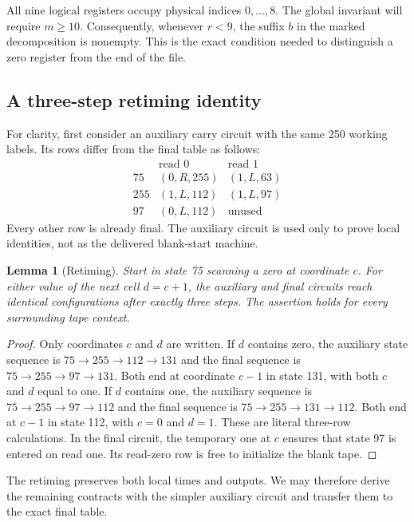 \documentclass[11pt]{article}
\newtheorem{lemma}{Lemma}
\begin{document}
All nine logical registers occupy physical indices $0,\ldots,8$.  The
global invariant will require $m\geq10$.  Consequently, whenever $r<9$,
the suffix $b$ in the marked decomposition is nonempty.  This is the exact
condition needed to distinguish a zero register from the end of the file.

\subsection{A three-step retiming identity}

For clarity, first consider an auxiliary carry circuit with the same 250
working labels.  Its rows differ from the final table as follows:
\[
\begin{array}{c|cc}
 & \text{read }0 & \text{read }1\\ \hline
75 & (0,R,255)&(1,L,63)\\
255&(1,L,112)&(1,L,97)\\
97&(0,L,112)&\text{unused}
\end{array}
\]
Every other row is already final.  The auxiliary circuit is used only to
prove local identities, not as the delivered blank-start machine.

\begin{lemma}[Retiming]
Start in state 75 scanning a zero at coordinate $c$.  For either value of
the next cell $d=c+1$, the auxiliary and final circuits reach identical
configurations after exactly three steps.  The assertion holds for every
surrounding tape context.
\end{lemma}
\begin{proof}
Only coordinates $c$ and $d$ are written.  If $d$ contains zero, the
auxiliary state sequence is
$75\to255\to112\to131$ and the final sequence is
$75\to255\to97\to131$.
Both end at coordinate $c-1$ in state 131, with both $c$ and $d$ equal to
one.  If $d$ contains one, the auxiliary sequence is
$75\to255\to97\to112$ and the final sequence is
$75\to255\to131\to112$.
Both end at $c-1$ in state 112, with $c=0$ and $d=1$.  These are literal
three-row calculations.  In the final circuit, the temporary one at $c$
ensures that state 97 is entered on read one.  Its read-zero row is free
to initialize the blank tape.
\end{proof}

The retiming preserves both local times and outputs.  We may therefore
derive the remaining contracts with the simpler auxiliary circuit and
transfer them to the exact final table.
\end{document}
